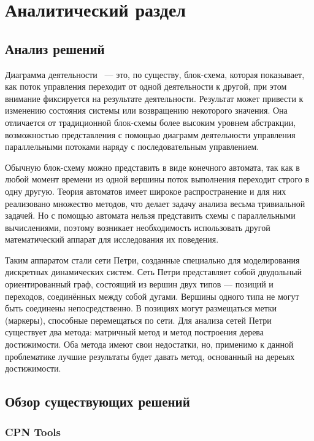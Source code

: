 \chapter{Аналитический раздел}
\label{cha:analysis}

\section{Анализ решений}

Диаграмма деятельности ~--- это, по существу, блок-схема, которая показывает, как поток управления переходит от одной деятельности к другой, при этом внимание фиксируется на результате деятельности. Результат может привести к изменению состояния системы или возвращению некоторого значения. Она отличается от традиционной блок-схемы более высоким уровнем абстракции, возможностью представления с помощью диаграмм деятельности управления параллельными потоками наряду с последовательным управлением.

Обычную блок-схему можно представить в виде конечного автомата, так как в любой момент времени из одной вершины поток выполнения переходит строго в одну другую. Теория автоматов имеет широкое распространение и для них реализовано множество методов, что делает задачу анализа весьма тривиальной задачей. Но с помощью автомата нельзя представить схемы с параллельными вычислениями, поэтому возникает необходимость использовать другой математический аппарат для исследования их поведения.

Таким аппаратом стали сети Петри, созданные специально для моделирования дискретных динамических систем. Сеть Петри представляет собой двудольный ориентированный граф, состоящий из вершин двух типов — позиций и переходов, соединённых между собой дугами. Вершины одного типа не могут быть соединены непосредственно. В позициях могут размещаться метки (маркеры), способные перемещаться по сети. Для анализа сетей Петри существует два метода: матричный метод и метод построения дерева достижимости. Оба метода имеют свои недостатки, но, применимо к данной проблематике лучшие результаты будет давать метод, основанный на дереьях достижимости.

\section{Обзор существующих решений}

\subsection{CPN Tools}

